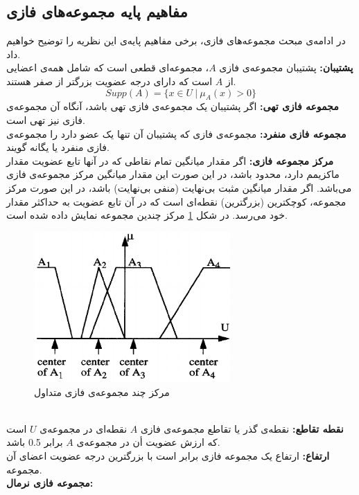 \documentclass[12pt,a4paper]{article}
\theoremstyle{definition}
\begin{document}
 \subsection{ مفاهیم پایه مجموعه‌های فازی}
 در ادامه‌ی مبحث مجموعه‌های فازی، برخی مفاهیم پایه‌ی این نظریه را توضیح خواهیم داد. \\
 \textbf{پشتیبان:}
 پشتیبان مجموعه‌ی فازی $A$، مجموعه‌ای قطعی است که شامل همه‌ی اعضایی از $A$ است که دارای درجه عضویت بزرگتر از صفر هستند.
 \begin{equation}\label{eq:e_supp}
 	Supp(A)=\{ x \in U\ |\ \mu_{A}(x) > 0 \}
\end{equation}
\textbf{مجموعه فازی تهی:}
اگر پشتیبان یک مجموعه‌ی فازی تهی باشد، آنگاه آن مجموعه‌ی فازی نیز تهی است. \\
\textbf{مجموعه‌ فازی منفرد:}
مجموعه‌ی فازی که پشتیبان آن تنها یک عضو دارد را مجموعه‌ی فازی منفرد یا یگانه گویند.\\
\textbf{مرکز مجموعه فازی:}
اگر مقدار میانگین تمام نقاطی که در آنها تابع عضویت مقدار ماکزیمم دارد، محدود باشد، در این صورت این مقدار میانگین مرکز مجموعه‌ی فازی می‌باشد. اگر مقدار میانگین مثبت بی‌نهایت (منفی بی‌نهایت) باشد، در این صورت مرکز مجموعه، کوچکترین (بزرگترین) نقطه‌ای است که در آن تابع عضویت به حداکثر مقدار خود می‌رسد. در شکل 
\ref{fig:f_5}
مرکز چندین مجموعه نمایش داده شده است.
\begin{figure}[h]
	\centering 
	\includegraphics[width=75mm]{Images/Fig5.png}
	\vspace{-0.5cm}
	\caption{مرکز چند مجموعه‌ی فازی متداول}\label{fig:f_5}
\end{figure}\\
\textbf{نقطه تقاطع:}
نقطه‌ی گذر یا تقاطع مجموعه‌ی فازی $A$ نقطه‌ای در مجموعه‌ی $U$ است که ارزش عضویت أن در مجموعه‌ی $A$ برابر 0.5 باشد.\\
\textbf{ارتفاع:}
ارتفاع یک مجموعه فازی برابر است با بزرگترین درجه عضویت اعضای آن مجموعه.\\
\textbf{مجموعه فازی نرمال:}
\end{document}
